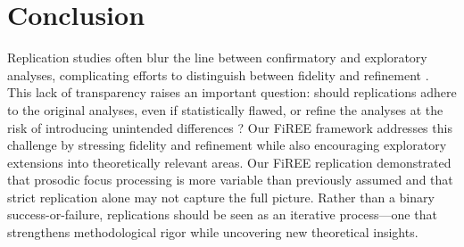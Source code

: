 \section{Conclusion}
Replication studies often blur the line between confirmatory and exploratory analyses, complicating efforts to distinguish between fidelity and refinement \parencite{Yanai2020}. This lack of transparency raises an important question: should replications adhere to the original analyses, even if statistically flawed, or refine the analyses at the risk of introducing unintended differences \parencite{mcmanus2022replication}? Our FiREE framework addresses this challenge by stressing fidelity and refinement while also encouraging exploratory extensions into theoretically relevant areas. Our FiREE replication demonstrated that prosodic focus processing is more variable than previously assumed and that strict replication alone may not capture the full picture. Rather than a binary success-or-failure, replications should be seen as an iterative process—one that strengthens methodological rigor while uncovering new theoretical insights.